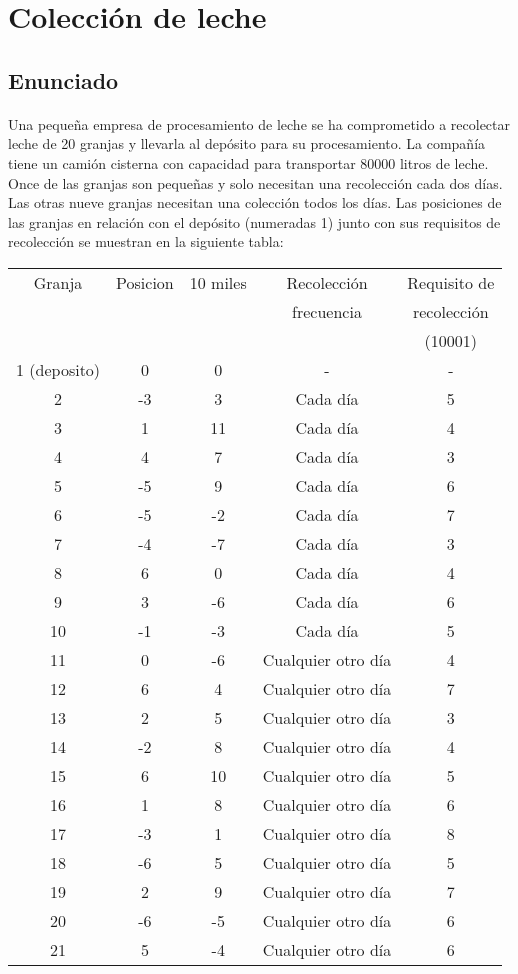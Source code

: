 \section{Colección de leche}
\subsection{Enunciado}
\paragraph{} Una pequeña empresa de procesamiento de leche se ha comprometido a recolectar leche de 20 granjas y llevarla al depósito para su procesamiento. La compañía tiene un camión cisterna con capacidad para transportar 80000 litros de leche. Once de las granjas son pequeñas y solo necesitan una recolección cada dos días. Las otras nueve granjas necesitan una colección todos los días. Las posiciones de las granjas en relación con el depósito (numeradas 1) junto con sus requisitos de recolección se muestran en la siguiente tabla:

\begin{center}
\begin{tabular}{ccccc}
\hline 
Granja & Posicion & 10 miles & Recolección  & Requisito de \\ 
 &  &  & frecuencia & recolección \\ 
 &  &  &  & (10001) \\ 
\hline 
1 (deposito) & 0 & 0 & - & - \\ 
2 & -3 & 3 & Cada día & 5 \\ 
3 & 1 & 11 & Cada día & 4 \\ 
4 & 4 & 7 & Cada día & 3 \\ 
5 & -5 & 9 & Cada día & 6 \\ 
6 & -5 & -2 & Cada día & 7 \\ 
7 & -4 & -7 & Cada día & 3 \\ 
8 & 6 & 0 & Cada día & 4 \\ 
9 & 3 & -6 & Cada día & 6 \\ 
10 & -1 & -3 & Cada día & 5 \\ 
11 & 0 & -6 & Cualquier otro día & 4 \\ 
12 & 6 & 4 & Cualquier otro día & 7 \\ 
13 & 2 & 5 & Cualquier otro día & 3 \\ 
14 & -2 & 8 & Cualquier otro día & 4 \\ 
15 & 6 & 10 & Cualquier otro día & 5 \\ 
16 & 1 & 8 & Cualquier otro día & 6 \\ 
17 & -3 & 1 & Cualquier otro día & 8 \\ 
18 & -6 & 5 & Cualquier otro día & 5 \\ 
19 & 2 & 9 & Cualquier otro día & 7 \\ 
20 & -6 & -5 & Cualquier otro día & 6 \\ 
21 & 5 & -4 & Cualquier otro día & 6 \\ 
\hline 
\end{tabular} 
\end{center}
